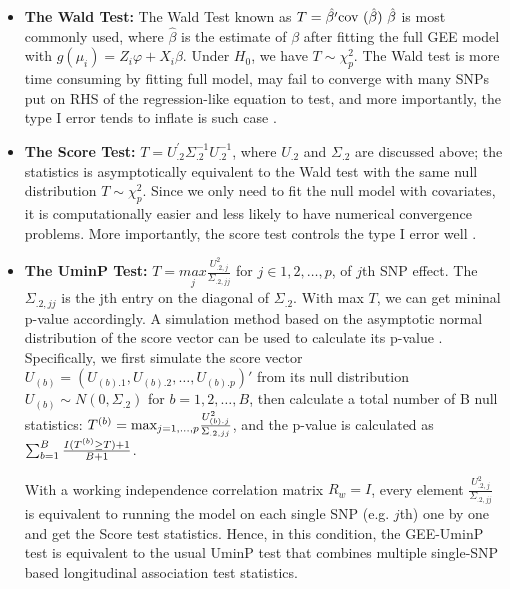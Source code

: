\documentclass[12pt]{article}
\begin{document}
\begin{itemize}
\item \textbf{The Wald Test:} The Wald Test known as $T=\hat{\beta'}\text{cov (\ensuremath{\hat{\beta}}) }\hat{\beta}$ is most commonly used, where $\hat{\beta}$ is the estimate of $\beta$ after fitting the full GEE model with $g(\mu_i) = Z_i\varphi + X_i \beta$. Under $H_0$, we have $T \sim \chi_{p}^2$. The Wald test is more time consuming by fitting full model, may fail to converge with many SNPs put on RHS of the regression-like equation to test, and more importantly, the type I error tends to inflate is such case \cite{pan2014powerful,zhang2014testing}.
\item \textbf{The Score Test:} $T=U_{.2}^{'}\Sigma_{.2}^{-1}U_{.2}^{-1}$, where $U_{.2}$ and $\Sigma_{.2}$ are discussed above; the statistics is asymptotically equivalent to the Wald test with the same null distribution $T \sim \chi_{p}^2$. Since we only need to fit the null model with covariates, it is computationally easier and less likely to have numerical convergence
problems. More importantly, the score test controls the type I error well \cite{pan2014powerful,zhang2014testing}.
\item \textbf{The UminP Test: }$T=\underset{j}{max}\frac{U_{.2,j}^{2}}{\Sigma_{.2,jj}}$
for $j\in 1,2,\dots,p$, of $j$th SNP effect. The $\Sigma_{.2,jj}$ is the jth entry on the diagonal of $\Sigma_{.2}$. With max $T$, we can get mininal p-value accordingly.
A simulation method based on the asymptotic normal distribution of
the score vector can be used to calculate its p-value \cite{pan2014powerful,zhang2014testing}. Specifically, we first simulate the score vector $U_{(b)} = ( U_{(b).1}, U_{(b).2},\ldots, U_{(b).p} )'$ from its null distribution  $U_{(b)} \sim N(0, \Sigma_{.2} )$ for $b = 1, 2, \ldots, B$, then calculate a total number of B null statistics: $T^{(b)} = \textrm{max}_{j = 1,\ldots,p} { U^2_{(b).j} \over  \Sigma_{.2,jj} }$, and the p-value is calculated as $\sum_{b=1}^B { I(T^{(b)} \geq T ) + 1  \over B + 1 } $.

With a working independence correlation matrix $R_w = I$, every element $\frac{U_{.2,j}^{2}}{\Sigma_{.2,jj}}$ is equivalent to running the model on each single SNP (e.g. $j$th) one by one and get the Score test statistics. Hence, in this condition, the GEE-UminP test is equivalent to the usual UminP test that combines multiple single-SNP based longitudinal association test statistics.
\end{itemize}
\end{document}
